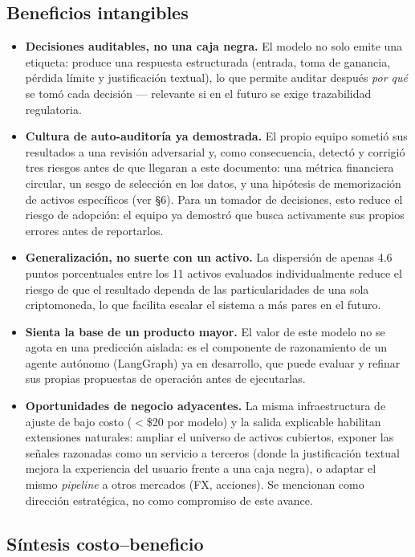 \documentclass[11pt]{article}
\begin{document}
\subsection{Beneficios intangibles}

\begin{itemize}
\item \textbf{Decisiones auditables, no una caja negra.} El modelo no solo emite una etiqueta: produce una respuesta estructurada (entrada, toma de ganancia, p\'erdida l\'imite y justificaci\'on textual), lo que permite auditar despu\'es \emph{por qu\'e} se tom\'o cada decisi\'on --- relevante si en el futuro se exige trazabilidad regulatoria.
\item \textbf{Cultura de auto-auditor\'ia ya demostrada.} El propio equipo someti\'o sus resultados a una revisi\'on adversarial y, como consecuencia, detect\'o y corrigi\'o tres riesgos antes de que llegaran a este documento: una m\'etrica financiera circular, un sesgo de selecci\'on en los datos, y una hip\'otesis de memorizaci\'on de activos espec\'ificos (ver \S6). Para un tomador de decisiones, esto reduce el riesgo de adopci\'on: el equipo ya demostr\'o que busca activamente sus propios errores antes de reportarlos.
\item \textbf{Generalizaci\'on, no suerte con un activo.} La dispersi\'on de apenas 4.6 puntos porcentuales entre los 11 activos evaluados individualmente reduce el riesgo de que el resultado dependa de las particularidades de una sola criptomoneda, lo que facilita escalar el sistema a m\'as pares en el futuro.
\item \textbf{Sienta la base de un producto mayor.} El valor de este modelo no se agota en una predicci\'on aislada: es el componente de razonamiento de un agente aut\'onomo (LangGraph) ya en desarrollo, que puede evaluar y refinar sus propias propuestas de operaci\'on antes de ejecutarlas.
\item \textbf{Oportunidades de negocio adyacentes.} La misma infraestructura de ajuste de bajo costo ($<$\$20 por modelo) y la salida explicable habilitan extensiones naturales: ampliar el universo de activos cubiertos, exponer las se\~nales razonadas como un servicio a terceros (donde la justificaci\'on textual mejora la experiencia del usuario frente a una caja negra), o adaptar el mismo \textit{pipeline} a otros mercados (FX, acciones). Se mencionan como direcci\'on estrat\'egica, no como compromiso de este avance.
\end{itemize}

\subsection{S\'intesis costo--beneficio}
\end{document}
